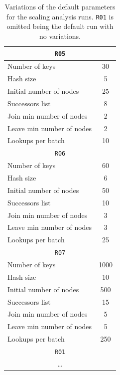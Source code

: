 \documentclass[11pt,twocolumn,letterpaper]{article}
\begin{document}
	\begin{table}[!h]
		\caption{Variations of the default parameters for the scaling analysis runs. \texttt{R01} is omitted being the default run with no variations.}
		\label{tab:netsize_runs}
		\centering
		\begin{tabular}{lc}
			\hline
		    \multicolumn{2}{c}{\texttt{R05}}\\
			\hline
			Number of keys & 30\\
			\hline
			Hash size & 5\\
			\hline
			Initial number of nodes & 25\\
			\hline
			Successors list & 8\\
			\hline
			Join min number of nodes & 2\\
			\hline
			Leave min number of nodes & 2\\
			\hline
			Lookups per batch & 10\\
			\hline
			\hline
		    
		    \multicolumn{2}{c}{\texttt{R06}}\\
			\hline
			Number of keys & 60\\
			\hline
			Hash size & 6\\
			\hline
			Initial number of nodes & 50\\
			\hline
			Successors list & 10\\
			\hline
			Join min number of nodes & 3\\
			\hline
			Leave min number of nodes & 3\\
			\hline
			Lookups per batch & 25\\
			\hline
			\hline

			\multicolumn{2}{c}{\texttt{R07}}\\
			\hline
			Number of keys & 1000\\
			\hline
			Hash size & 10\\
			\hline
			Initial number of nodes & 500\\
			\hline
			Successors list & 15\\
			\hline
			Join min number of nodes & 5\\
			\hline
			Leave min number of nodes & 5\\
			\hline
			Lookups per batch & 250\\
			\hline
			\hline
			
			\multicolumn{2}{c}{\texttt{R01}}\\
			\hline
			\multicolumn{2}{c}{\dots}\\
			\hline
		\end{tabular}
	\end{table}		
\end{document}

